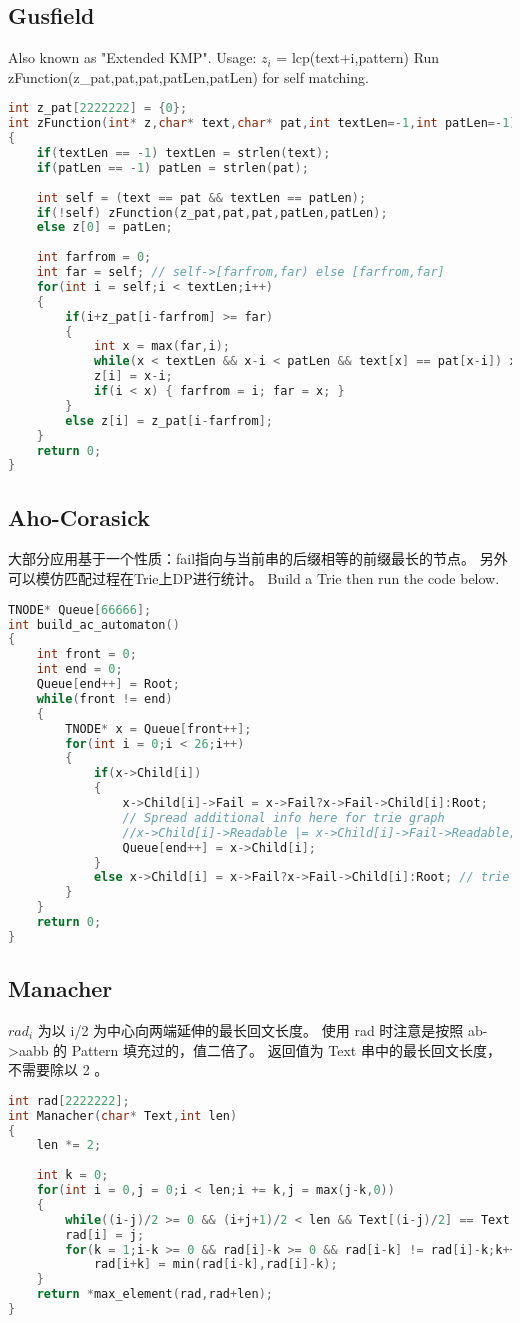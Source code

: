 \subsection{Gusfield}
Also known as "Extended KMP". 
  Usage:
    $z_i$ = lcp(text+i,pattern)
    Run zFunction(z\_pat,pat,pat,patLen,patLen) for self matching. 
\begin{lstlisting}[language=C++]
int z_pat[2222222] = {0};
int zFunction(int* z,char* text,char* pat,int textLen=-1,int patLen=-1)
{
	if(textLen == -1) textLen = strlen(text);
	if(patLen == -1) patLen = strlen(pat);
	
	int self = (text == pat && textLen == patLen);
	if(!self) zFunction(z_pat,pat,pat,patLen,patLen);
	else z[0] = patLen;
	
	int farfrom = 0;
	int far = self; // self->[farfrom,far) else [farfrom,far]
	for(int i = self;i < textLen;i++)
	{
		if(i+z_pat[i-farfrom] >= far)
		{
			int x = max(far,i);
			while(x < textLen && x-i < patLen && text[x] == pat[x-i]) x++;
			z[i] = x-i;
			if(i < x) { farfrom = i; far = x; }
		}
		else z[i] = z_pat[i-farfrom];
	}
	return 0;
}
\end{lstlisting}
\subsection{Aho-Corasick}
 大部分应用基于一个性质：fail指向与当前串的后缀相等的前缀最长的节点。
 另外可以模仿匹配过程在Trie上DP进行统计。
 Build a Trie then run the code below. 
\begin{lstlisting}[language=C++]
TNODE* Queue[66666];
int build_ac_automaton()
{
	int front = 0;
	int end = 0;
	Queue[end++] = Root;
	while(front != end)
	{
		TNODE* x = Queue[front++];
		for(int i = 0;i < 26;i++)
		{
			if(x->Child[i])
			{
				x->Child[i]->Fail = x->Fail?x->Fail->Child[i]:Root;
				// Spread additional info here for trie graph
				//x->Child[i]->Readable |= x->Child[i]->Fail->Readable; 
				Queue[end++] = x->Child[i];
			}
			else x->Child[i] = x->Fail?x->Fail->Child[i]:Root; // trie graph
		}
	}
	return 0;
}
\end{lstlisting}
\subsection{Manacher}
$rad_i$ 为以 i/2 为中心向两端延伸的最长回文长度。
使用 rad 时注意是按照 ab->aabb 的 Pattern 填充过的，值二倍了。
返回值为 Text 串中的最长回文长度，不需要除以 2 。
\begin{lstlisting}[language=C++]
int rad[2222222];
int Manacher(char* Text,int len)
{
	len *= 2;
	
	int k = 0;
	for(int i = 0,j = 0;i < len;i += k,j = max(j-k,0))
	{
		while((i-j)/2 >= 0 && (i+j+1)/2 < len && Text[(i-j)/2] == Text[(i+j+1)/2]) j++;
		rad[i] = j;
		for(k = 1;i-k >= 0 && rad[i]-k >= 0 && rad[i-k] != rad[i]-k;k++)
			rad[i+k] = min(rad[i-k],rad[i]-k);
	}
	return *max_element(rad,rad+len);
}
\end{lstlisting}
